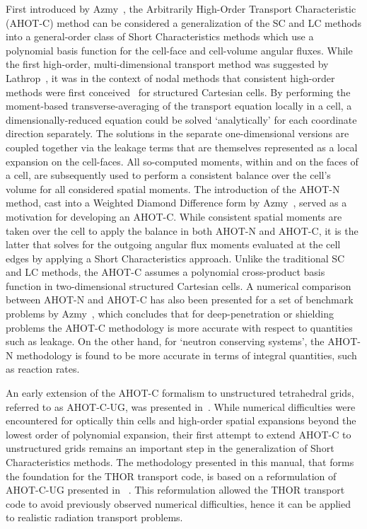 First introduced by Azmy~\cite{Azmy1992}, the Arbitrarily High-Order Transport Characteristic (\ac{AHOT-C}) method can be considered a generalization of the \ac{SC} and \ac{LC} methods into a general-order class of Short Characteristics methods which use a polynomial basis function for the cell-face and cell-volume angular fluxes.
While the first high-order, multi-dimensional transport method was suggested by Lathrop~\cite{Lathrop1969}, it was in the context of nodal methods that consistent high-order methods were first conceived~\cite{Azmy1992} for structured Cartesian cells.
By performing the moment-based transverse-averaging of the transport equation locally in a cell, a dimensionally-reduced equation could be solved `analytically' for each coordinate direction separately.
The solutions in the separate one-dimensional versions are coupled together via the leakage terms that are themselves represented as a local expansion on the cell-faces.
All so-computed moments, within and on the faces of a cell, are subsequently used to perform a consistent balance over the cell's volume for all considered spatial moments.
The introduction of the \ac{AHOT-N} method, cast into a Weighted Diamond Difference form by Azmy~\cite{Azmy1988a}, served as a motivation for developing an \ac{AHOT-C}.
While consistent spatial moments are taken over the cell to apply the balance in both \ac{AHOT-N} and \ac{AHOT-C}, it is the latter that solves for the outgoing angular flux moments evaluated at the cell edges by applying a Short Characteristics approach.
Unlike the traditional \ac{SC} and \ac{LC} methods, the \ac{AHOT-C} assumes a polynomial cross-product basis function in two-dimensional structured Cartesian cells.
A numerical comparison between \ac{AHOT-N} and \ac{AHOT-C} has also been presented for a set of benchmark problems by Azmy~\cite{Azmy1992}, which concludes that for deep-penetration or shielding problems the \ac{AHOT-C} methodology is more accurate with respect to quantities such as leakage.
On the other hand, for `neutron conserving systems', the \ac{AHOT-N} methodology is found to be more accurate in terms of integral quantities, such as reaction rates.

An early extension of the \ac{AHOT-C} formalism to unstructured tetrahedral grids,  referred  to as \acs{AHOT-C-UG}, was presented in~\cite{Azmy2001}.
While numerical difficulties were encountered for optically thin cells and high-order spatial expansions beyond the lowest order of polynomial expansion, their first attempt to extend \ac{AHOT-C} to unstructured grids remains an important step in the generalization of Short Characteristics methods.
The methodology presented in this manual, that forms the foundation for the \ac{THOR} transport code, is based on a reformulation of \acs{AHOT-C-UG} presented in ~\cite{FerrerPhD}.
This reformulation allowed the \ac{THOR} transport code to avoid previously observed numerical difficulties, hence it can be applied to realistic radiation transport problems.
